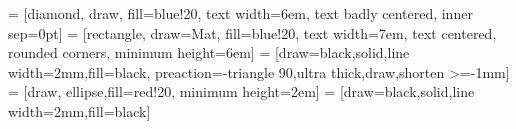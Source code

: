  = [diamond, draw, fill=blue!20,
    text width=6em, text badly centered, inner sep=0pt]
 = [rectangle, draw=Mat, fill=blue!20,
    text width=7em, text centered, rounded corners, minimum height=6em]
 = [draw=black,solid,line width=2mm,fill=black,
preaction={-triangle 90,ultra thick,draw,shorten >=-1mm}]
 = [draw, ellipse,fill=red!20, 
    minimum height=2em]
 = [draw=black,solid,line width=2mm,fill=black]

